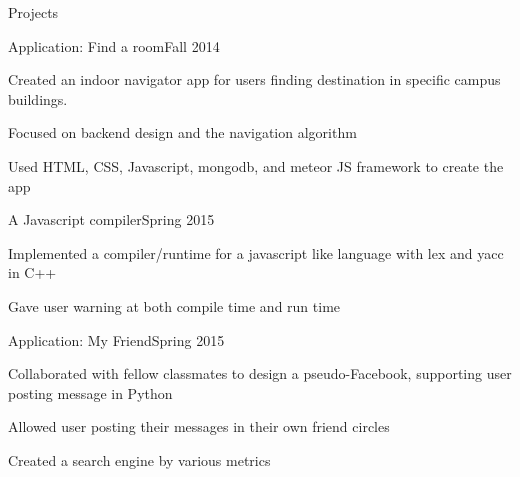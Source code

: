 \documentclass{resume} %
\begin{document}
\begin{rSection}{Projects}

\begin{rSubsection}{Application: Find a room}{Fall 2014}{}{}
\item Created an indoor navigator app for users finding destination in specific campus buildings.
\item Focused on backend design and the navigation algorithm
\item Used HTML, CSS, Javascript, mongodb, and meteor JS framework to create the app
\end{rSubsection}

\begin{rSubsection}{A Javascript compiler}{Spring 2015}{}{}
\item Implemented a compiler/runtime for a javascript like language with lex and yacc in C++
\item Gave user warning at both compile time and run time
\end{rSubsection}

\begin{rSubsection}{Application: My Friend}{Spring 2015}{}{}
\item Collaborated with fellow classmates to design a pseudo-Facebook, supporting user posting message in Python
\item Allowed user posting their messages in their own friend circles
\item Created a search engine by various metrics
\end{rSubsection}









\end{rSection}
\end{document}
